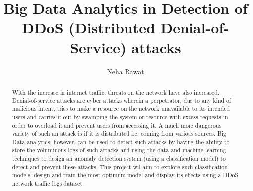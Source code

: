 \title{Big Data Analytics in Detection of DDoS (Distributed Denial-of-Service) attacks}


\author{Neha Rawat}



\renewcommand{\shortauthors}{N. Rawat}


\begin{abstract}
	With the increase in internet traffic, threats on the network have also increased. Denial-of-service attacks are cyber attacks wherein a perpetrator, due to any kind of malicious intent, tries to make a resource on the network unavailable to its intended users and carries it out by swamping the system or resource with excess requests in order to overload it and prevent users from accessing it. A much more dangerous variety of such an attack is if it is distributed i.e. coming from various sources. Big Data analytics, however, can be used to detect such attacks by having the ability to store the voluminous logs of such attacks and using the data and machine learning techniques to design an anomaly detection system (using a classification model) to detect and prevent these attacks. This project wil aim to explore such classification models, design and train the most optimum model and display its effects using a DDoS network traffic logs dataset.
\end{abstract}


\maketitle

